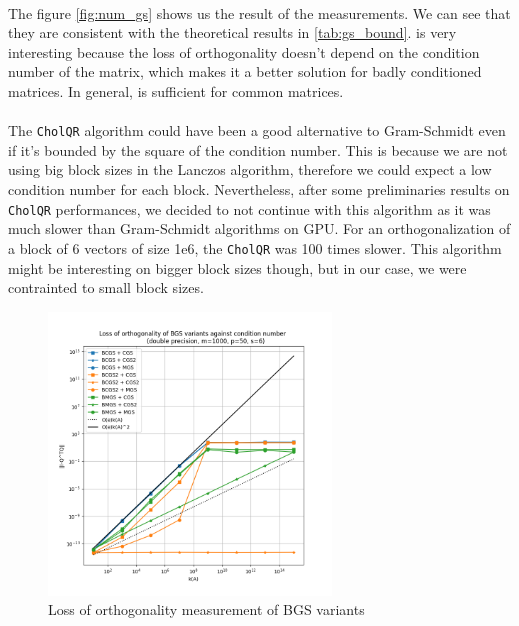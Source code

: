 \paragraph*{}
The figure \ref{fig:num_gs} shows us the result of the measurements. We can see that they are consistent with the theoretical results in \ref{tab:gs_bound}. \cgsi is very interesting because the loss of orthogonality doesn't depend on the condition number of the matrix, which makes it a better solution for badly conditioned matrices. In general, \mgs is sufficient for common matrices. 

\paragraph*{}
The \texttt{CholQR} algorithm could have been a good alternative to Gram-Schmidt even if it's bounded by the square of the condition number. This is because we are not using big block sizes in the Lanczos algorithm, therefore we could expect a low condition number for each block. Nevertheless, after some preliminaries results on \texttt{CholQR} performances, we decided to not continue with this algorithm as it was much slower than Gram-Schmidt algorithms on GPU. For an orthogonalization of a block of 6 vectors of size 1e6, the \texttt{CholQR} was 100 times slower. This algorithm might be interesting on bigger block sizes though, but in our case, we were contrainted to small block sizes.


\begin{figure}[h!]
\includegraphics[width=0.67\textwidth]{results/orthogo_bench/numerical_bench_bgs.png}
\centering
\caption{Loss of orthogonality measurement of BGS variants}
\label{fig:num_bgs}
\end{figure}

